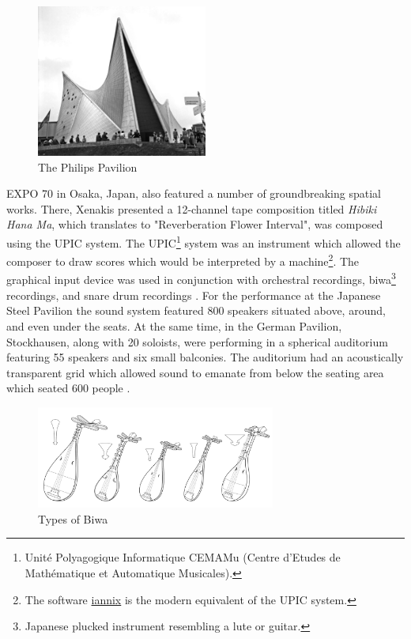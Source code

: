 \begin{figure}[h]%
\centering
\includegraphics[width=0.5\textwidth]{img/expo58.jpg} 
\caption{The Philips Pavilion \cite{wikipedia_2020_expo}}
\end{figure}

EXPO 70 in Osaka, Japan, also featured a number of groundbreaking spatial works. There, Xenakis presented a 12-channel tape composition titled \textit{Hibiki Hana Ma}, which translates to "Reverberation Flower Interval", was composed using the UPIC system. The UPIC\footnote{Unité Polyagogique Informatique CEMAMu (Centre d'Etudes de Mathématique et Automatique Musicales).} system was an instrument which allowed the composer to draw scores which would be interpreted by a machine\footnote{The software \href{https://www.iannix.org/en/whatisiannix/}{iannix} is the modern equivalent of the UPIC system.}. The graphical input device was used in conjunction with orchestral recordings, biwa\footnote{Japanese plucked instrument resembling a lute or guitar.} recordings, and snare drum recordings \cite{IannisXe73:online}. For the performance at the Japanese Steel Pavilion the sound system featured 800 speakers situated above, around, and even under the seats. At the same time, in the German Pavilion, Stockhausen, along with 20 soloists, were performing in a spherical auditorium featuring 55 speakers and six small balconies. The auditorium had an acoustically transparent grid which allowed sound to emanate from below the seating area which seated 600 people \cite{zvonar1999history}.

\begin{figure}[h]%
\centering
\includegraphics[width=0.7\textwidth]{img/types-of-biwa.jpg}
\caption{Types of Biwa \cite{FileType46:online}}
\end{figure}

